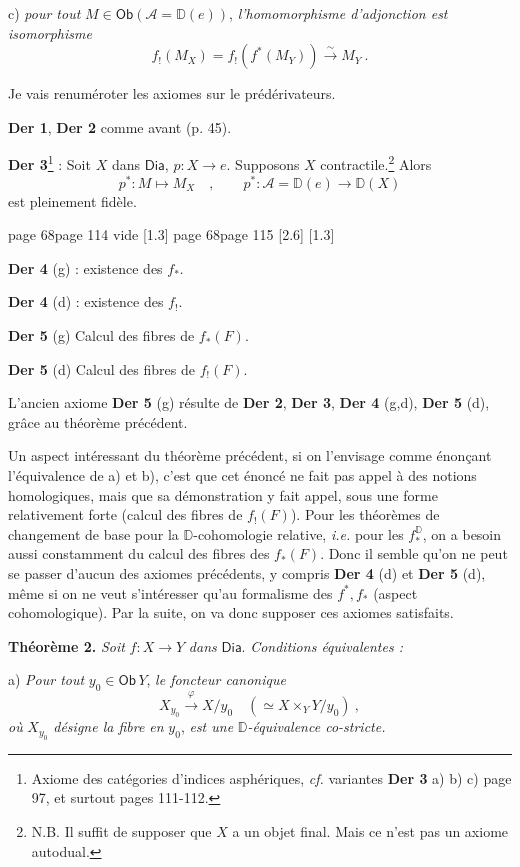 \documentclass[11pt,leqno]{article}
\newcommand{\printedpage}[1]{\marginnote{\scriptsize\sffamily ed.\ #1}}
\newcommand{\msp}[1]{%
  \begingroup\def\thismsp{#1}\def\blankmsp{page 114 vide}%
  \ifx\thismsp\blankmsp
    \marginnote{\scriptsize\sffamily [114: vide]}[1.3\baselineskip]%
  \else\def\followingmsp{page 115}%
    \ifx\thismsp\followingmsp
      \marginnote{\scriptsize\sffamily [page 115]}[2.6\baselineskip]%
    \else\marginnote{\scriptsize\sffamily [#1]}[1.3\baselineskip]\fi
  \fi\endgroup}
\newcommand{\Dia}{\ensuremath{\mathsf{Dia}}}
\newcommand{\Ob}{\ensuremath{\mathsf{Ob}}}
\newcommand{\isoto}{\overset{\sim}{\to}}
\newcommand{\D}{\ensuremath{\mathbb{D}}}
\begin{document}
c) \textit{pour tout} $M \in \Ob(\mathcal{A} = \D(e))$, \textit{l'homomorphisme d'adjonction est} \textit{isomorphisme}
\[
f_!(M_X) = f_!(f^*(M_Y)) \isoto M_Y \ .
\]

Je vais renuméroter les axiomes sur le prédérivateurs. %

\noindent\textbf{Der 1}, \textbf{Der 2} comme avant (p. 45).

\noindent\textbf{Der 3}\footnote[28]{Axiome des catégories d'indices asphériques, \textit{cf.} variantes \textbf{Der 3} a) b) c) page 97, et surtout pages 111-112.} : Soit $X$ dans $\Dia$, $p : X \to e$. Supposons $X$ contractile.\footnote[29]{N.B. Il suffit de supposer que $X$ a un objet final. Mais ce n'est pas un axiome autodual.} Alors
\[
p^* : M \longmapsto M_X \quad , \qquad p^* : \mathcal{A} = \D(e) \longrightarrow \D(X)
\]
est pleinement fidèle.

\printedpage{40}
\msp{page 68}

\noindent\textbf{Der 4} (g) : existence des $f_*$.

\noindent\textbf{Der 4} (d) : existence des $f_!$.

\noindent\textbf{Der 5} (g) Calcul des fibres de $f_*(F)$.

\noindent\textbf{Der 5} (d) Calcul des fibres de $f_!(F)$.

\noindent L'ancien axiome \textbf{Der 5} (g) résulte de \textbf{Der 2}, \textbf{Der 3}, \textbf{Der 4} (g,d), \textbf{Der 5} (d), grâce au théorème précédent.

Un aspect intéressant du théorème précédent, si on l'envisage comme énonçant l'équivalence de a) et b), c'est que cet énoncé ne fait pas appel à des notions homologiques, mais que sa démonstration y fait appel, sous une forme relativement forte (calcul des fibres de $f_!(F)$). Pour les théorèmes de changement de base pour la $\D$-cohomologie relative, \textit{i.e.} pour les $f_*^{\D}$, on a besoin aussi constamment du calcul des fibres des $f_*(F)$. Donc il semble qu'on ne peut se passer d'aucun des axiomes précédents, y compris \textbf{Der 4} (d) et \textbf{Der 5} (d), même si on ne veut s'intéresser qu'au formalisme des $f^*, f_*$ (aspect cohomologique). Par la suite, on va donc supposer ces axiomes satisfaits.

\noindent\textbf{Théorème 2.} \textit{Soit} $f : X \to Y$ \textit{dans} $\Dia$. \textit{Conditions équivalentes :}

a) \textit{Pour tout} $y_0 \in \Ob\, Y$, \textit{le foncteur canonique}
\[
X_{y_0} \overset{\varphi}{\longrightarrow} X/y_0 \quad (\simeq X \times_Y Y/y_0) \ ,
\]
\textit{où} $X_{y_0}$ \textit{désigne la fibre en} $y_0$, \textit{est une} $\D$\textit{-équivalence co-stricte.}
\end{document}
